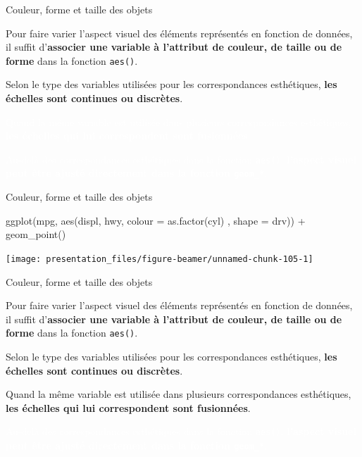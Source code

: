 \documentclass[12pt,ignorenonframetext,handout,]{beamer}
\newenvironment{Shaded}{}{}
\newcommand{\DataTypeTok}[1]{#1}
\newcommand{\KeywordTok}[1]{\textcolor[rgb]{0.00,0.00,1.00}{#1}}
\newcommand{\NormalTok}[1]{#1}
\newcommand{\OperatorTok}[1]{#1}
\newcommand{\StringTok}[1]{\textcolor[rgb]{0.00,0.50,0.50}{#1}}
\renewenvironment{Shaded}{\begin{snugshade}}{\end{snugshade}}
\begin{document}
\begin{frame}{Couleur, forme et taille des objets}
\protect\hypertarget{couleur-forme-et-taille-des-objets-5}{}

Pour faire varier l’aspect visuel des éléments représentés en fonction
de données, il suffit
d’\textbf{associer une variable à l'attribut de couleur, de taille ou de forme}
dans la fonction \texttt{aes()}.

Selon le type des variables utilisées pour les correspondances
esthétiques, \textbf{les échelles sont continues ou discrètes}.

\textcolor{white}{Quand la même variable est utilisée dans plusieurs correspondances esthétiques, \textbf{les échelles qui lui correspondent sont fusionnées}.}

\textcolor{white}{Au-delà des correspondances esthétiques dans la fonction \texttt{aes()}, \textbf{l'aspect visuel peut être ajusté directement dans la fonction \texttt{geom\_*}}.}

\end{frame}

\begin{frame}[fragile]{Couleur, forme et taille des objets}
\protect\hypertarget{couleur-forme-et-taille-des-objets-6}{}

\footnotesize \center

\begin{Shaded}
\begin{Highlighting}[]
\KeywordTok{ggplot}\NormalTok{(mpg, }\KeywordTok{aes}\NormalTok{(displ, hwy, }\DataTypeTok{colour =} \KeywordTok{as.factor}\NormalTok{(cyl)}
\NormalTok{  , }\DataTypeTok{shape =}\NormalTok{ drv)) }\OperatorTok{+}
\StringTok{  }\KeywordTok{geom_point}\NormalTok{()}
\end{Highlighting}
\end{Shaded}

\texttt{[image: presentation\_files/figure-beamer/unnamed-chunk-105-1]}

\end{frame}

\begin{frame}{Couleur, forme et taille des objets}
\protect\hypertarget{couleur-forme-et-taille-des-objets-7}{}

Pour faire varier l’aspect visuel des éléments représentés en fonction
de données, il suffit
d’\textbf{associer une variable à l'attribut de couleur, de taille ou de forme}
dans la fonction \texttt{aes()}.

Selon le type des variables utilisées pour les correspondances
esthétiques, \textbf{les échelles sont continues ou discrètes}.

Quand la même variable est utilisée dans plusieurs correspondances
esthétiques,
\textbf{les échelles qui lui correspondent sont fusionnées}.

\textcolor{white}{Au-delà des correspondances esthétiques dans la fonction \texttt{aes()}, \textbf{l'aspect visuel peut être ajusté directement dans la fonction \texttt{geom\_*}}.}

\end{frame}
\end{document}
